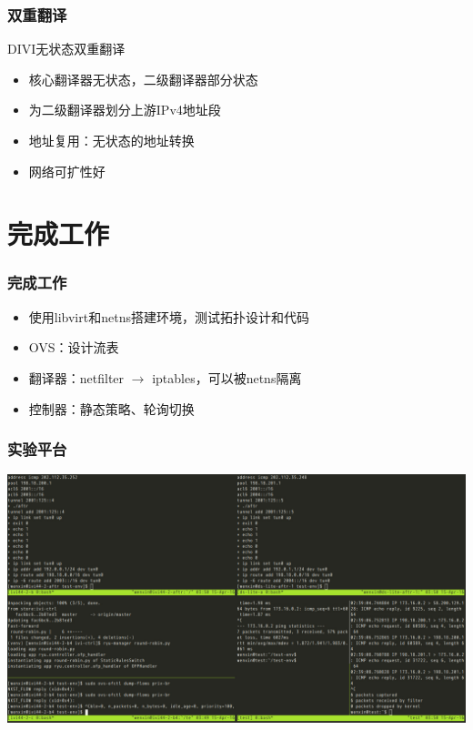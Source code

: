 \documentclass{beamer}
\begin{document}
\begin{frame}
  \frametitle{双重翻译}

  \begin{block}{DIVI无状态双重翻译}
    \begin{itemize}
    \item 核心翻译器无状态，二级翻译器部分状态
    \item 为二级翻译器划分上游IPv4地址段
    \item 地址复用：无状态的地址转换
    \item 网络可扩性好
    \end{itemize}
  \end{block}
\end{frame}

\section{完成工作}
\begin{frame}
  \frametitle{完成工作}

  \begin{block}{}
    \begin{itemize}
    \item 使用libvirt和netns搭建环境，测试拓扑设计和代码
    \item OVS：设计流表
    \item 翻译器：netfilter $\rightarrow$ iptables，可以被netns隔离
    \item 控制器：静态策略、轮询切换
    \end{itemize}
  \end{block}
\end{frame}

\begin{frame}
  \frametitle{实验平台}

  \begin{center}
    \includegraphics[width=\textwidth]{figs/test-env.jpeg}
  \end{center}
\end{frame}
\end{document}
